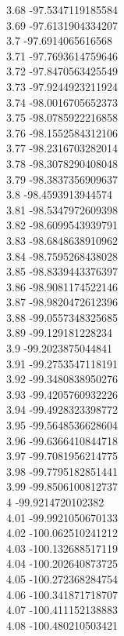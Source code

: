 {3.68	-97.5347119185584\\
3.69	-97.6131904334207\\
3.7	-97.6914065616568\\
3.71	-97.7693614759646\\
3.72	-97.8470563425549\\
3.73	-97.9244923211924\\
3.74	-98.0016705652373\\
3.75	-98.0785922216858\\
3.76	-98.1552584312106\\
3.77	-98.2316703282014\\
3.78	-98.3078290408048\\
3.79	-98.3837356909637\\
3.8	-98.4593913944574\\
3.81	-98.5347972609398\\
3.82	-98.6099543939791\\
3.83	-98.6848638910962\\
3.84	-98.7595268438028\\
3.85	-98.8339443376397\\
3.86	-98.9081174522146\\
3.87	-98.9820472612396\\
3.88	-99.0557348325685\\
3.89	-99.129181228234\\
3.9	-99.2023875044841\\
3.91	-99.2753547118191\\
3.92	-99.3480838950276\\
3.93	-99.4205760932226\\
3.94	-99.4928323398772\\
3.95	-99.5648536628604\\
3.96	-99.6366410844718\\
3.97	-99.7081956214775\\
3.98	-99.7795182851441\\
3.99	-99.8506100812737\\
4	-99.9214720102382\\
4.01	-99.9921050670133\\
4.02	-100.062510241212\\
4.03	-100.132688517119\\
4.04	-100.202640873725\\
4.05	-100.272368284754\\
4.06	-100.341871718707\\
4.07	-100.411152138883\\
4.08	-100.480210503421\\
}
